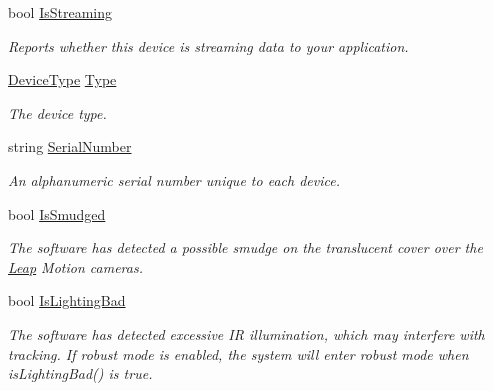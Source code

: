 \begin{DoxyCompactItemize}
bool \mbox{\hyperlink{class_leap_1_1_device_ae809e2e9f708ce086fe501ed1a768cbf}{Is\+Streaming}}
\begin{DoxyCompactList}\small\item\em Reports whether this device is streaming data to your application. \end{DoxyCompactList}\item 
\mbox{\hyperlink{class_leap_1_1_device_acbae26ae873dec763876ed257b38456f}{Device\+Type}} \mbox{\hyperlink{class_leap_1_1_device_aa191da9618d51fa0d1a1890aa9814218}{Type}}
\begin{DoxyCompactList}\small\item\em The device type. \end{DoxyCompactList}\item 
string \mbox{\hyperlink{class_leap_1_1_device_a26012df4a3abc27d41c002192afa8579}{Serial\+Number}}
\begin{DoxyCompactList}\small\item\em An alphanumeric serial number unique to each device. \end{DoxyCompactList}\item 
bool \mbox{\hyperlink{class_leap_1_1_device_a66b17a4d148ed209633678e473cf4258}{Is\+Smudged}}
\begin{DoxyCompactList}\small\item\em The software has detected a possible smudge on the translucent cover over the \mbox{\hyperlink{namespace_leap}{Leap}} Motion cameras. \end{DoxyCompactList}\item 
bool \mbox{\hyperlink{class_leap_1_1_device_a38ea488cc97a098df9b65e9eb56577e5}{Is\+Lighting\+Bad}}
\begin{DoxyCompactList}\small\item\em The software has detected excessive IR illumination, which may interfere with tracking. If robust mode is enabled, the system will enter robust mode when is\+Lighting\+Bad() is true. \end{DoxyCompactList}\end{DoxyCompactItemize}


